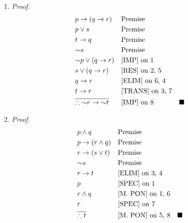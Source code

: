 \documentclass[11pt, notitlepage, leqno]{article}
\renewcommand{\neg}{\mathord{\sim}}
\begin{document}
\begin{enumerate}
\begin{enumerate}
\item \textit{Proof.} \nopagebreak \vspace{-10pt} 
\begin{align} \setcounter{equation}{0}
	& p \to (q \to r) 	&& \textrm{Premise}\\
 	& p \vee s 		&& \textrm{Premise}\\
 	& t \to q	 		&& \textrm{Premise}\\
 	& \neg s 			&& \textrm{Premise}\\
 	& \neg p \vee (q \to r) && \textrm{[IMP] on 1}\\
 	& s \vee (q \to r)	&& \textrm{[RES] on 2, 5}\\
 	& q \to r 			&& \textrm{[ELIM] on 6, 4}\\
 	& t \to r 			&& \textrm{[TRANS] on 3, 7}\\
 	& \notag\overline{\therefore \neg r \to \neg t} 	&& \textrm{[IMP] on 8} & \blacksquare
\end{align}

\item \textit{Proof.} \nopagebreak \vspace{-10pt}
\begin{align} \setcounter{equation}{0}
	& p \wedge q 		&& \textrm{Premise}\\
 	& p \to (r \wedge q)	&& \textrm{Premise}\\
 	& r \to (s \vee t)	&& \textrm{Premise}\\
 	& \neg s 			&& \textrm{Premise}\\
 	& r \to t 			&& \textrm{[ELIM] on 3, 4}\\
 	& p 				&& \textrm{[SPEC] on 1}\\
 	& r \wedge q 		&& \textrm{[M.\ PON] on 1, 6}\\
 	& r 				&& \textrm{[SPEC] on 7}\\
 	& \notag\overline{\therefore t} 				&& \textrm{[M.\ PON] on 5, 8} & \blacksquare
\end{align}


\end{enumerate}
\end{enumerate}
\end{document}
